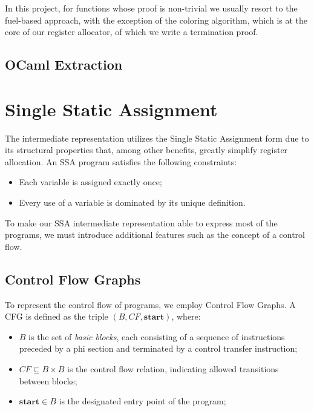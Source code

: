 In this project, for functions whose proof is non-trivial we usually resort to the fuel-based approach, with the exception of the coloring algorithm, which is at the core of our register allocator, of which we write a termination proof.

\subsection{OCaml Extraction}

\section{Single Static Assignment}
\label{sec:ssa}

The intermediate representation utilizes the Single Static Assignment form due to its structural properties that, among other benefits, greatly simplify register allocation. An SSA program satisfies the following constraints:

\begin{itemize}
    \item Each variable is assigned exactly once;
    \item Every use of a variable is dominated by its unique definition.
\end{itemize}

To make our SSA intermediate representation able to express most of the programs, we must introduce additional features such as the concept of a control flow.

\subsection{Control Flow Graphs}
\label{subsec:cfg}

To represent the control flow of programs, we employ Control Flow Graphs. A CFG is defined as the triple $(B, CF, \textbf{start})$, where:

\begin{itemize}
    \item $B$ is the set of \textit{basic blocks}, each consisting of a sequence of instructions preceded by a phi section and terminated by a control transfer instruction;
    \item $CF \subseteq B \times B$ is the control flow relation, indicating allowed transitions between blocks;
    \item $\textbf{start} \in B$ is the designated entry point of the program;
\end{itemize}

